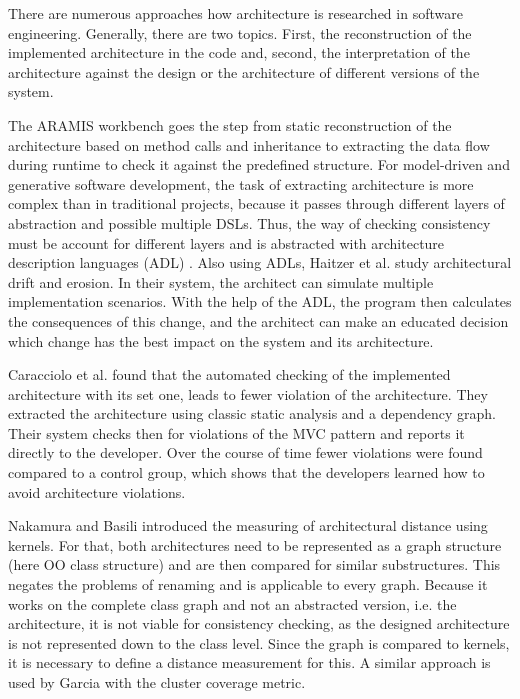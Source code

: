 \documentclass[conference]{IEEEtran}
\begin{document}
There are numerous approaches how architecture is researched in software engineering. Generally, there are two topics. First, the reconstruction of the implemented architecture in the code and, second, the interpretation of the architecture against the design or the architecture of different versions of the system.

The ARAMIS workbench \cite{Aramis} goes the step from static reconstruction of the architecture based on method calls and inheritance to extracting the data flow during runtime to check it against the predefined structure. 
For model-driven and generative software development, the task of extracting architecture is more complex than in traditional projects, because it passes through different layers of abstraction and possible multiple DSLs. 
Thus, the way of checking consistency must be account for different layers and is abstracted with architecture description languages (ADL) \cite{ArcCons,Arc-MDSE}. 
Also using ADLs, Haitzer et al. \cite{Arc-Decision} study architectural drift and erosion. In their system, the architect can simulate multiple implementation scenarios. With the help of the ADL, the program then calculates the consequences of this change, and the architect can make an educated decision which change has the best impact on the system and its architecture. 

Caracciolo et al. \cite{ArcConf} found that the automated checking of the implemented architecture with its set one, leads to fewer violation of the architecture. They extracted the architecture using classic static analysis and a dependency graph. Their system checks then for violations of the MVC pattern and reports it directly to the developer. Over the course of time fewer violations were found compared to a control group, which shows that the developers learned how to avoid architecture violations.

Nakamura and Basili \cite{StructDist} introduced the measuring of architectural distance using kernels. For that, both architectures need to be represented as a graph structure (here OO class structure) and are then compared for similar substructures. This negates the problems of renaming and is applicable to every graph. 
Because it works on the complete class graph and not an abstracted version, i.e. the architecture, it is not viable for consistency checking, as the designed architecture is not represented down to the class level. 
Since the graph is compared to kernels, it is necessary to define a distance measurement for this. A similar approach is used by Garcia \cite{arcade-thesis} with the cluster coverage metric.
\end{document}
